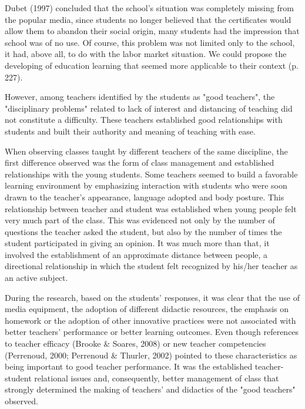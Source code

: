 \documentclass[11pt, a4paper]{article}
\begin{document}
Dubet (1997) concluded that the school's situation was completely missing from the popular media, since students no
longer believed that the certificates would allow them to abandon their social origin, many students had the impression
that school was of no use. Of course, this problem was not limited only to the school, it had, above all, to do with the labor
market situation. We could propose the developing of education learning that seemed more applicable to their context (p.
227).

However, among teachers identified by the students as "good teachers", the "disciplinary problems" related to lack of
interest and distancing of teaching did not constitute a difficulty. These teachers established good relationships with
students and built their authority and meaning of teaching with ease.

When observing classes taught by different teachers of the same discipline, the first difference observed was the form of
class management and established relationships with the young students. Some teachers seemed to build a favorable
learning environment by emphasizing interaction with students who were soon drawn to the teacher's appearance,
language adopted and body posture. This relationship between teacher and student was established when young people
felt very much part of the class. This was evidenced not only by the number of questions the teacher asked the student, but
also by the number of times the student participated in giving an opinion. It was much more than that, it involved the
establishment of an approximate distance between people, a directional relationship in which the student felt recognized
by his/her teacher as an active subject.

During the research, based on the students' responses, it was clear that the use of media equipment, the adoption of
different didactic resources, the emphasis on homework or the adoption of other innovative practices were not associated
with better teachers' performance or better learning outcomes. Even though references to teacher efficacy (Brooke \&
Soares, 2008) or new teacher competencies (Perrenoud, 2000; Perrenoud \& Thurler, 2002) pointed to these characteristics
as being important to good teacher performance. It was the established teacher-student relational issues and, consequently,
better management of class that strongly determined the making of teachers' and didactics of the "good teachers"
observed.
\end{document}

